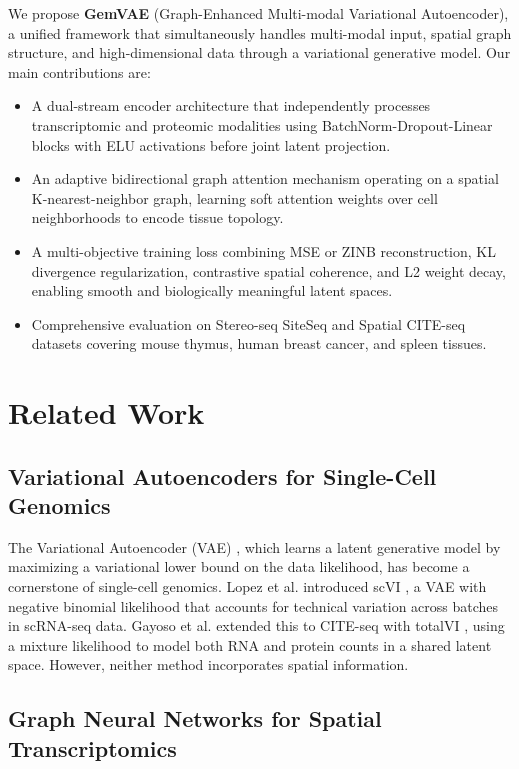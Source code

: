 \documentclass[conference]{IEEEtran}
\begin{document}
We propose \textbf{GemVAE} (Graph-Enhanced Multi-modal Variational Autoencoder), a unified framework that simultaneously handles multi-modal input, spatial graph structure, and high-dimensional data through a variational generative model. Our main contributions are:

\begin{itemize}
    \item A dual-stream encoder architecture that independently processes transcriptomic and proteomic modalities using BatchNorm-Dropout-Linear blocks with ELU activations before joint latent projection.
    \item An adaptive bidirectional graph attention mechanism operating on a spatial K-nearest-neighbor graph, learning soft attention weights over cell neighborhoods to encode tissue topology.
    \item A multi-objective training loss combining MSE or ZINB reconstruction, KL divergence regularization, contrastive spatial coherence, and L2 weight decay, enabling smooth and biologically meaningful latent spaces.
    \item Comprehensive evaluation on Stereo-seq SiteSeq and Spatial CITE-seq datasets covering mouse thymus, human breast cancer, and spleen tissues.
\end{itemize}

\section{Related Work}

\subsection{Variational Autoencoders for Single-Cell Genomics}

The Variational Autoencoder (VAE) \cite{b8}, which learns a latent generative model by maximizing a variational lower bound on the data likelihood, has become a cornerstone of single-cell genomics. Lopez et al. introduced scVI \cite{b3}, a VAE with negative binomial likelihood that accounts for technical variation across batches in scRNA-seq data. Gayoso et al. extended this to CITE-seq with totalVI \cite{b4}, using a mixture likelihood to model both RNA and protein counts in a shared latent space. However, neither method incorporates spatial information.

\subsection{Graph Neural Networks for Spatial Transcriptomics}
\end{document}
